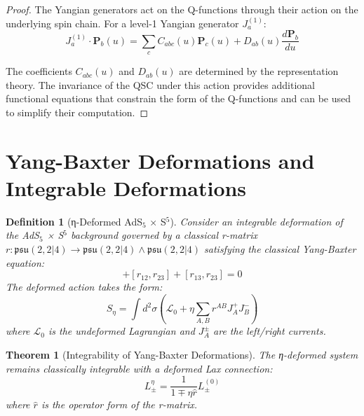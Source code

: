 \documentclass[11pt]{article}
\newtheorem{theorem}{Theorem}
\newtheorem{definition}{Definition}
\begin{document}
\begin{proof}
The Yangian generators act on the Q-functions through their action on the underlying spin chain. For a level-1 Yangian generator $J_a^{(1)}$:
\begin{equation}
J_a^{(1)} \cdot \mathbf{P}_b(u) = \sum_c C_{abc}(u) \mathbf{P}_c(u) + D_{ab}(u) \frac{d\mathbf{P}_b}{du}
\end{equation}

The coefficients $C_{abc}(u)$ and $D_{ab}(u)$ are determined by the representation theory. The invariance of the QSC under this action provides additional functional equations that constrain the form of the Q-functions and can be used to simplify their computation.
\end{proof}

\section{Yang-Baxter Deformations and Integrable Deformations}

\begin{definition}[η-Deformed AdS$_5$ × S$^5$]
Consider an integrable deformation of the AdS$_5$ × S$^5$ background governed by a classical r-matrix $r: \mathfrak{psu}(2,2|4) \to \mathfrak{psu}(2,2|4) \wedge \mathfrak{psu}(2,2|4)$ satisfying the classical Yang-Baxter equation:
\begin{equation}
[r_{12}, r_{13}] + [r_{12}, r_{23}] + [r_{13}, r_{23}] = 0
\end{equation}
The deformed action takes the form:
\begin{equation}
S_{\eta} = \int d^2\sigma \left( \mathcal{L}_0 + \eta \sum_{A,B} r^{AB} J_A^+ J_B^- \right)
\end{equation}
where $\mathcal{L}_0$ is the undeformed Lagrangian and $J_A^{\pm}$ are the left/right currents.
\end{definition}

\begin{theorem}[Integrability of Yang-Baxter Deformations]
The η-deformed system remains classically integrable with a deformed Lax connection:
\begin{equation}
L_{\pm}^{\eta} = \frac{1}{1 \mp \eta \hat{r}} L_{\pm}^{(0)}
\end{equation}
where $\hat{r}$ is the operator form of the r-matrix.
\end{theorem}
\end{document}
